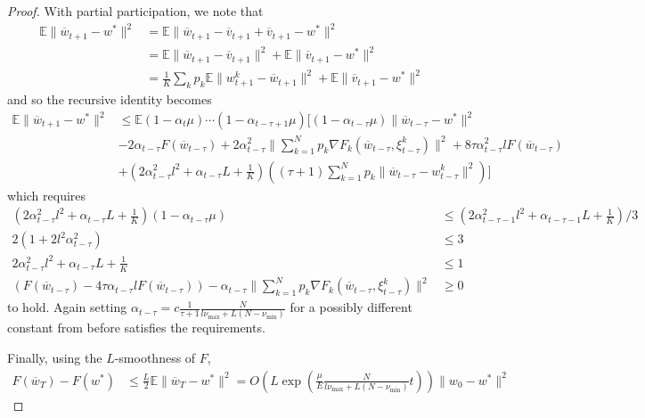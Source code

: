 \begin{proof}
	With partial participation, we note that 
	\begin{align*}
	\mathbb{E}\|\overline{w}_{t+1}-w^{\ast}\|^{2} & =\mathbb{E}\|\overline{w}_{t+1}-\overline{v}_{t+1}+\overline{v}_{t+1}-w^{\ast}\|^{2}\\
	& =\mathbb{E}\|\overline{w}_{t+1}-\overline{v}_{t+1}\|^{2}+\mathbb{E}\|\overline{v}_{t+1}-w^{\ast}\|^{2}\\
	& =\frac{1}{K}\sum_{k}p_{k}\mathbb{E}\|w_{t+1}^{k}-\overline{w}_{t+1}\|^{2}+\mathbb{E}\|\overline{v}_{t+1}-w^{\ast}\|^{2}
	\end{align*}
	and so the recursive identity becomes 
	\begin{align*}
	\mathbb{E}\|\overline{w}_{t+1}-w^{\ast}\|^{2} & \leq\mathbb{E}(1-\alpha_{t}\mu)\cdots(1-\alpha_{t-\tau+1}\mu)[(1-\alpha_{t-\tau}\mu)\|\overline{w}_{t-\tau}-w^{\ast}\|^{2}\\
	& -2\alpha_{t-\tau}F(\overline{w}_{t-\tau})+2\alpha_{t-\tau}^{2}\|\sum_{k=1}^{N}p_{k}\nabla F_{k}(\overline{w}_{t-\tau},\xi_{t-\tau}^{k})\|^{2}+8\tau\alpha_{t-\tau}^{2}lF(\overline{w}_{t-\tau})\\
	& +(2\alpha_{t-\tau}^{2}l^{2}+\alpha_{t-\tau}L+\frac{1}{K})((\tau+1)\sum_{k=1}^{N}p_{k}\|\overline{w}_{t-\tau}-w_{t-\tau}^{k}\|^{2})]
	\end{align*}
	which requires 
	\begin{align*}
	(2\alpha_{t-\tau}^{2}l^{2}+\alpha_{t-\tau}L+\frac{1}{K})(1-\alpha_{t-\tau}\mu) & \leq(2\alpha_{t-\tau-1}^{2}l^{2}+\alpha_{t-\tau-1}L+\frac{1}{K})/3\\
	2(1+2l^{2}\alpha_{t-\tau}^{2}) & \leq3\\
	2\alpha_{t-\tau}^{2}l^{2}+\alpha_{t-\tau}L+\frac{1}{K} & \leq1\\
	(F(\overline{w}_{t-\tau})-4\tau\alpha_{t-\tau}lF(\overline{w}_{t-\tau}))-\alpha_{t-\tau}\|\sum_{k=1}^{N}p_{k}\nabla F_{k}(\overline{w}_{t-\tau},\xi_{t-\tau}^{k})\|^{2} & \geq0
	\end{align*}
	to hold. Again setting $\alpha_{t-\tau}=c\frac{1}{\tau+1}\frac{N}{l\nu_{\max}+L(N-\nu_{\min})}$
	for a possibly different constant from before satisfies the requirements.
	
	Finally, using the $L$-smoothness of $F$, 
	\begin{align*}
	F(\overline{w}_{T})-F(w^{\ast}) & \leq\frac{L}{2}\mathbb{E}\|\overline{w}_{T}-w^{\ast}\|^{2}=O(L\exp(\frac{\mu}{E}\frac{N}{l\nu_{\max}+L(N-\nu_{\min})}t))\|w_{0}-w^{\ast}\|^{2}
	\end{align*}
\end{proof}

